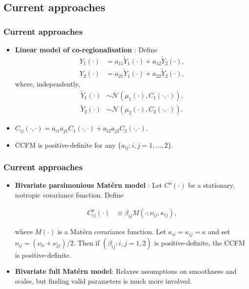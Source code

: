 \documentclass{beamer}
\newcommand{\Yt}{\widetilde{Y}}
\begin{document}

\subsection{Current approaches}

\begin{frame}
\frametitle{Current approaches}

\begin{itemize}

\item {\bf Linear model of co-regionalisation} \citep[LMC,][]{Wackernagel1995}: Define
\begin{align}
    Y_1(\cdot) &= a_{11}\Yt_1(\cdot) + a_{12}\Yt_2(\cdot),\\
    Y_2(\cdot) &= a_{21}\Yt_1(\cdot) + a_{22}\Yt_2(\cdot),
\end{align}
where, independently,
\begin{align}
    \Yt_1(\cdot) &\sim \mathcal{N}(\mu_1(\cdot), C_{1}(\cdot,\cdot)),\\
    \Yt_2(\cdot) &\sim \mathcal{N}(\mu_2(\cdot), C_{2}(\cdot,\cdot)).
\end{align}

\item $C_{ij}(\cdot,\cdot) = a_{i1}a_{j1}C_{1}(\cdot,\cdot) + a_{i2}a_{j2}C_{2}(\cdot,\cdot)$.
\item CCFM is positive-definite for any $\{a_{ij}: i,j = 1,\dots,2\}$.
\end{itemize}
\end{frame}


\begin{frame}
\frametitle{Current approaches}

\begin{itemize}
\item {\bf Bivariate parsimonious Matérn model} \citep{Gneitingetal2010}: Let $C^o(\cdot)$ be a stationary, isotropic covariance function. Define

\begin{align}
    C_{ij}^o(\cdot) & \equiv \beta_{ij}M(\cdot; \nu_{ij}, \kappa_{ij}),
\end{align}

where $M(\cdot)$ is a Matérn covariance function. Let $\kappa_{ii} = \kappa_{ij} = \kappa$ and set $\nu_{ij} = (\nu_{ii} + \nu_{jj})/2$. Then if  $(\beta_{ij}:i,j = 1,2)$ is positive-definite, the CCFM is positive-definite.\vfill

\item {\bf Bivariate full Matérn model}:  Relaxes assumptions on smoothness and scales, but finding valid parameters is much more involved.\vfill
\end{itemize}

\end{frame}
\end{document}
